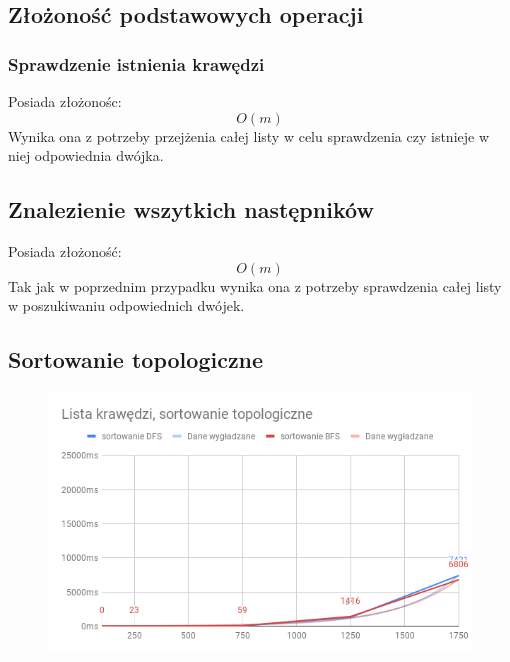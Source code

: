 \documentclass[]{article}
\begin{document}
	\subsection{Złożoność podstawowych operacji}
		\subsubsection{Sprawdzenie istnienia krawędzi}
			Posiada złożonośc:
			\begin{equation}
				O(m)
			\end{equation}
			Wynika ona z potrzeby przejżenia całej listy w celu sprawdzenia czy istnieje w niej odpowiednia dwójka.
		\subsection{Znalezienie wszytkich następników}
			Posiada złożoność:
			\begin{equation}
				O(m)
			\end{equation}
			Tak jak w poprzednim przypadku wynika ona z potrzeby sprawdzenia całej listy w poszukiwaniu odpowiednich dwójek.
	\subsection{Sortowanie topologiczne}
		\begin{figure}[H]
			\includegraphics[scale=0.6]{edge_list.png}
		\end{figure}
\end{document}
